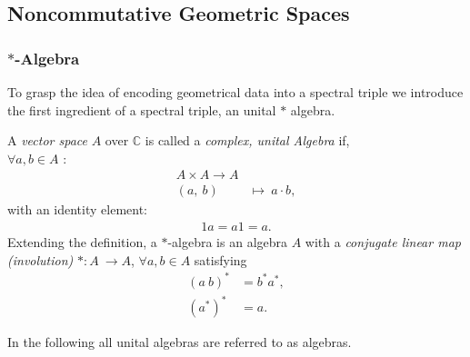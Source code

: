 \subsection{Noncommutative Geometric Spaces}
\subsubsection{$*$-Algebra}
To grasp the idea of encoding geometrical data into a spectral triple we
introduce the first ingredient of a spectral triple, an unital $*$ algebra.
\begin{mydefinition}
    A \textit{vector space} $A$ over $\mathbb{C}$ is called a \textit{complex, unital Algebra} if, \\
    $\forall a,b \in A$ :
            \begin{align}
            A \times A \rightarrow A\\
            (a,\ b)\ &\mapsto \ a\cdot b,
            \end{align}
    with an identity element:
            \begin{align}
            1a = a1 =a.
            \end{align}
    Extending the definition, a $*$-algebra is an algebra $A$ with a \textit{conjugate linear map (involution)} $*:A\ \rightarrow  A$,
    $\forall a, b \in A$ satisfying
    \begin{align}
        (a\ b)^* &= b^*a^*,\\
        (a^*)^* &= a.
    \end{align}
\end{mydefinition}
In the following all unital algebras are referred to as algebras.

